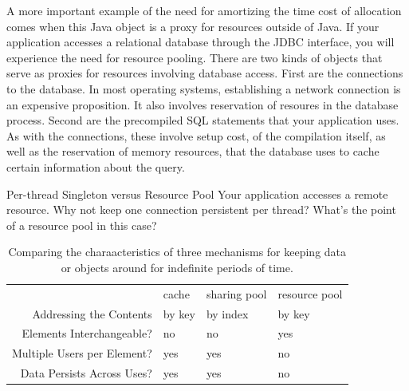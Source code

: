 A more important example of the need for amortizing the time cost of allocation
comes when this Java object is a proxy for resources outside of Java. If your
application accesses a relational database through the JDBC
interface, you will experience the need for resource pooling. There are two kinds
of objects that serve as proxies for resources involving database access. First
are the connections to the database. In most operating systems, establishing a
network connection is an expensive proposition. It also involves reservation of
resoures in the database process. Second are the precompiled SQL statements that
your application uses. As with the connections, these involve setup cost, of the
compilation itself, as well as the reservation of memory resources, that the
database uses to cache certain information about the query.

\begin{example}{Per-thread Singleton versus Resource Pool}
Your application accesses a remote resource. Why not keep one connection
persistent per thread? What's the point of a resource pool in this case?
\end{example}



\begin{table}
	\centering
	\begin{tabular}{rlll} \toprule
            & cache             & sharing pool & resource pool 
    \\ \cmidrule{2-4}
    Addressing the Contents     & by key       & by index & by key
    \\
        Elements Interchangeable?   & no    & no    & yes
    \\
    Multiple Users per Element? & yes   & yes   & no
    \\
    Data Persists Across Uses?  & yes   & yes   & no
    \\ \bottomrule
    \end{tabular}
	\caption{Comparing the charaacteristics of three mechanisms for keeping data
	or objects around for indefinite periods of time.}
	\label{tab:three-deferred-deletions}
\end{table}








